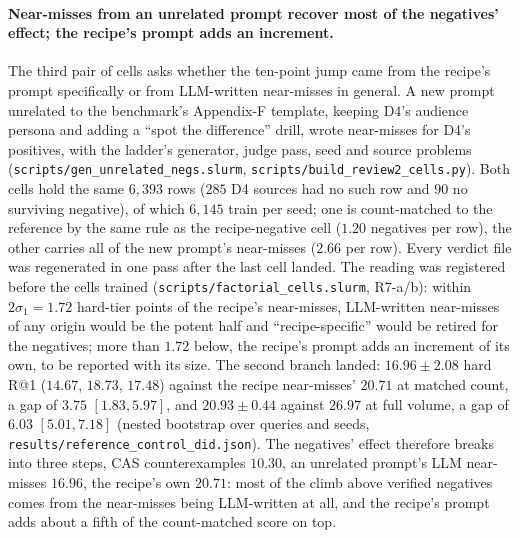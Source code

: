 \paragraph{Near-misses from an unrelated prompt recover most of the negatives' effect; the recipe's prompt adds an increment.}
The third pair of cells asks whether the ten-point jump came from the recipe's prompt specifically or from LLM-written near-misses in general. A new prompt unrelated to the benchmark's Appendix-F template, keeping D4's audience persona and adding a ``spot the difference'' drill, wrote near-misses for D4's positives, with the ladder's generator, judge pass, seed and source problems (\texttt{scripts/gen\_unrelated\_negs.slurm}, \texttt{scripts/build\_review2\_cells.py}). Both cells hold the same $6{,}393$ rows ($285$ D4 sources had no such row and $90$ no surviving negative), of which $6{,}145$ train per seed; one is count-matched to the reference by the same rule as the recipe-negative cell ($1.20$ negatives per row), the other carries all of the new prompt's near-misses ($2.66$ per row). Every verdict file was regenerated in one pass after the last cell landed. The reading was registered before the cells trained (\texttt{scripts/factorial\_cells.slurm}, R7-a/b): within $2\sigma_1 = 1.72$ hard-tier points of the recipe's near-misses, LLM-written near-misses of any origin would be the potent half and ``recipe-specific'' would be retired for the negatives; more than $1.72$ below, the recipe's prompt adds an increment of its own, to be reported with its size. The second branch landed: $16.96 \pm 2.08$ hard R@1 ($14.67$, $18.73$, $17.48$) against the recipe near-misses' $20.71$ at matched count, a gap of $3.75$ $[1.83, 5.97]$, and $20.93 \pm 0.44$ against $26.97$ at full volume, a gap of $6.03$ $[5.01, 7.18]$ (nested bootstrap over queries and seeds, \texttt{results/reference\_control\_did.json}). The negatives' effect therefore breaks into three steps, CAS counterexamples $10.30$, an unrelated prompt's LLM near-misses $16.96$, the recipe's own $20.71$: most of the climb above verified negatives comes from the near-misses being LLM-written at all, and the recipe's prompt adds about a fifth of the count-matched score on top.

